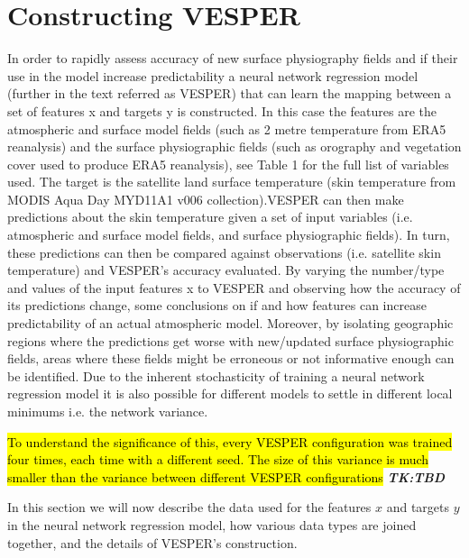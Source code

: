 \documentclass[hess, twostagejnl]{copernicus}
\begin{document}
\section{Constructing VESPER}\label{sec:2}
In order to rapidly assess accuracy of new surface physiography fields and if their use in the model increase predictability a neural network regression model (further in the text referred as VESPER) that can learn the mapping between a set of features x and targets y is constructed. In this case the features are the atmospheric and surface model fields (such as 2 metre temperature from ERA5 reanalysis) and the surface physiographic fields (such as orography and vegetation cover used to produce ERA5 reanalysis), see Table 1 for the full list of variables used. The target is the satellite land surface temperature (skin temperature from MODIS Aqua Day MYD11A1 v006 collection).VESPER can then make predictions about the skin temperature given a set of input variables (i.e. atmospheric and surface model fields, and surface physiographic fields). In turn, these predictions can then be compared against observations (i.e. satellite skin temperature) and VESPER's accuracy evaluated. By varying the number/type and values of the input features x to VESPER and observing how the accuracy of its predictions change, some conclusions on if and how features can increase predictability of an actual atmospheric model. Moreover, by isolating geographic regions where the predictions get worse with new/updated surface physiographic fields, areas where these fields might be erroneous or not informative enough can be identified. Due to the inherent stochasticity of training a neural network regression model it is also possible for different models to settle in different local minimums i.e. the network variance. \newline 
	
\noindent \hl{To understand the significance of this, every VESPER configuration was trained four times, each time with a different seed. The size of this variance is much smaller than the variance between different VESPER configurations} \textit{\textbf{TK:TBD}} \newline 
	

\noindent In this section we will now describe the data used for the features $x$ and targets $y$ in the neural network regression model, how various data types are joined together, and the details of VESPER’s construction.
\end{document}
